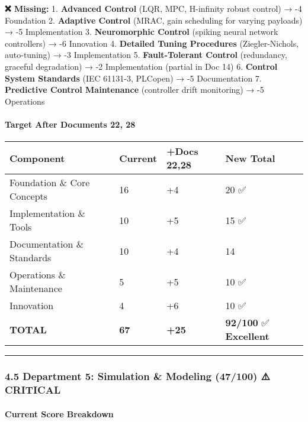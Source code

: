 \documentclass[
]{article}
\begin{document}
\textbf{❌ Missing:} 1. \textbf{Advanced Control} (LQR, MPC, H-infinity
robust control) → -4 Foundation 2. \textbf{Adaptive Control} (MRAC, gain
scheduling for varying payloads) → -5 Implementation 3.
\textbf{Neuromorphic Control} (spiking neural network controllers) → -6
Innovation 4. \textbf{Detailed Tuning Procedures} (Ziegler-Nichols,
auto-tuning) → -3 Implementation 5. \textbf{Fault-Tolerant Control}
(redundancy, graceful degradation) → -2 Implementation (partial in Doc
14) 6. \textbf{Control System Standards} (IEC 61131-3, PLCopen) → -5
Documentation 7. \textbf{Predictive Control Maintenance} (controller
drift monitoring) → -5 Operations

\hypertarget{target-after-documents-22-28}{%
\paragraph{Target After Documents 22,
28}\label{target-after-documents-22-28}}

\begin{longtable}[]{@{}llll@{}}
\toprule\noalign{}
Component & Current & +Docs 22,28 & New Total \\
\midrule\noalign{}
\endhead
\bottomrule\noalign{}
\endlastfoot
Foundation \& Core Concepts & 16 & +4 & 20 ✅ \\
Implementation \& Tools & 10 & +5 & 15 ✅ \\
Documentation \& Standards & 10 & +4 & 14 \\
Operations \& Maintenance & 5 & +5 & 10 ✅ \\
Innovation & 4 & +6 & 10 ✅ \\
\textbf{TOTAL} & \textbf{67} & \textbf{+25} & \textbf{92/100} ✅
\textbf{Excellent} \\
\end{longtable}

\begin{center}\rule{0.5\linewidth}{0.5pt}\end{center}

\hypertarget{department-5-simulation-modeling-47100-critical}{%
\subsubsection{4.5 Department 5: Simulation \& Modeling (47/100) ⚠️
CRITICAL}\label{department-5-simulation-modeling-47100-critical}}

\hypertarget{current-score-breakdown-4}{%
\paragraph{Current Score Breakdown}\label{current-score-breakdown-4}}
\end{document}
